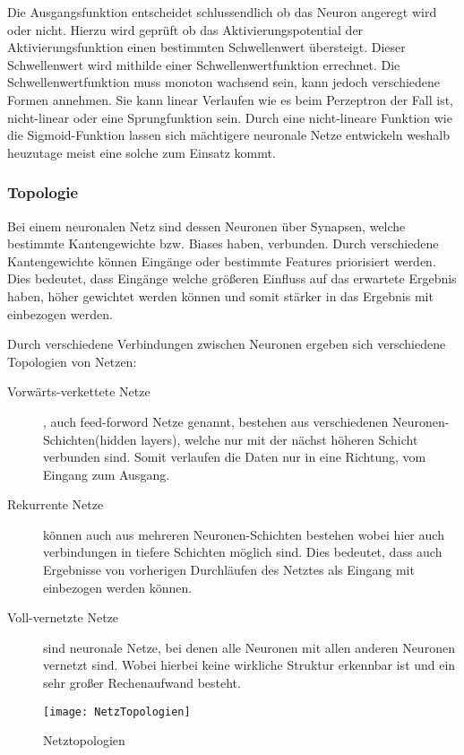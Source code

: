     \noindent
    Die Ausgangsfunktion entscheidet schlussendlich ob das Neuron angeregt wird oder nicht.
    Hierzu wird geprüft ob das Aktivierungspotential der Aktivierungsfunktion einen bestimmten Schwellenwert übersteigt.
    Dieser Schwellenwert wird mithilde einer Schwellenwertfunktion errechnet. 
    Die Schwellenwertfunktion muss monoton wachsend sein, kann jedoch verschiedene Formen annehmen. 
    Sie kann linear Verlaufen wie es beim Perzeptron der Fall ist, nicht-linear oder eine Sprungfunktion sein. 
    Durch eine nicht-lineare Funktion wie die Sigmoid-Funktion lassen sich mächtigere neuronale Netze entwickeln weshalb heuzutage meist eine solche zum Einsatz kommt.


    \subsubsection{Topologie}
    Bei einem neuronalen Netz sind dessen Neuronen über Synapsen, welche bestimmte Kantengewichte bzw. Biases haben, verbunden.
    Durch verschiedene Kantengewichte können Eingänge oder bestimmte Features priorisiert werden. 
    Dies bedeutet, dass Eingänge welche größeren Einfluss auf das erwartete Ergebnis haben, höher gewichtet werden können und somit stärker in das Ergebnis mit einbezogen werden.
    \newline

    \noindent
    Durch verschiedene Verbindungen zwischen Neuronen ergeben sich verschiedene Topologien von Netzen:
    \begin{description}
        \item[Vorwärts-verkettete Netze], auch feed-forword Netze genannt, bestehen aus verschiedenen Neuronen-Schichten(hidden layers), welche nur mit der nächst höheren Schicht verbunden sind. Somit verlaufen die Daten nur in eine Richtung, vom Eingang zum Ausgang.
        \item[Rekurrente Netze] können auch aus mehreren Neuronen-Schichten bestehen wobei hier auch verbindungen in tiefere Schichten möglich sind. Dies bedeutet, dass auch Ergebnisse von vorherigen Durchläufen des Netztes als Eingang mit einbezogen werden können.
        \item[Voll-vernetzte Netze] sind neuronale Netze, bei denen alle Neuronen mit allen anderen Neuronen vernetzt sind. Wobei hierbei keine wirkliche Struktur erkennbar ist und ein sehr großer Rechenaufwand besteht.
    \end{description}

    \begin{figure}[H]
        \centering
        \texttt{[image: NetzTopologien]}
        \caption{Netztopologien}
        \label{fig:NetzTopologien}
    \end{figure}



